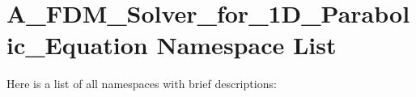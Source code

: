 \section{A\_\-FDM\_\-Solver\_\-for\_\-1D\_\-Parabolic\_\-Equation Namespace List}
Here is a list of all namespaces with brief descriptions:\begin{CompactList}
\item{}
\item{}
\end{CompactList}
